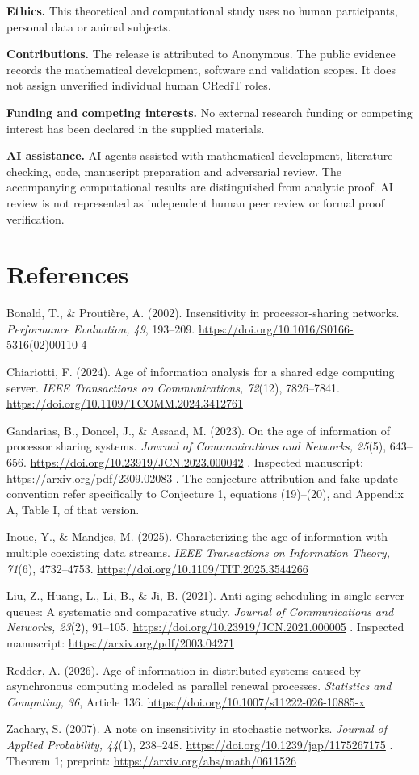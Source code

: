 \documentclass[
  11pt,
  a4paper,
]{scrartcl}
\begin{document}
\textbf{Ethics.} This theoretical and computational study uses no human
participants, personal data or animal subjects.

\textbf{Contributions.} The release is attributed to Anonymous. The
public evidence records the mathematical development, software and
validation scopes. It does not assign unverified individual human CRediT
roles.

\textbf{Funding and competing interests.} No external research funding
or competing interest has been declared in the supplied materials.

\textbf{AI assistance.} AI agents assisted with mathematical
development, literature checking, code, manuscript preparation and
adversarial review. The accompanying computational results are
distinguished from analytic proof. AI review is not represented as
independent human peer review or formal proof verification.

\section{References}\label{references}

Bonald, T., \& Proutière, A. (2002). Insensitivity in processor-sharing
networks. \emph{Performance Evaluation, 49}, 193--209.
\url{https://doi.org/10.1016/S0166-5316(02)00110-4}

Chiariotti, F. (2024). Age of information analysis for a shared edge
computing server. \emph{IEEE Transactions on Communications, 72}(12),
7826--7841. \url{https://doi.org/10.1109/TCOMM.2024.3412761}

Gandarias, B., Doncel, J., \& Assaad, M. (2023). On the age of
information of processor sharing systems. \emph{Journal of
Communications and Networks, 25}(5), 643--656.
\url{https://doi.org/10.23919/JCN.2023.000042} . Inspected manuscript:
\url{https://arxiv.org/pdf/2309.02083} . The conjecture attribution and
fake-update convention refer specifically to Conjecture 1, equations
(19)--(20), and Appendix A, Table I, of that version.

Inoue, Y., \& Mandjes, M. (2025). Characterizing the age of information
with multiple coexisting data streams. \emph{IEEE Transactions on
Information Theory, 71}(6), 4732--4753.
\url{https://doi.org/10.1109/TIT.2025.3544266}

Liu, Z., Huang, L., Li, B., \& Ji, B. (2021). Anti-aging scheduling in
single-server queues: A systematic and comparative study. \emph{Journal
of Communications and Networks, 23}(2), 91--105.
\url{https://doi.org/10.23919/JCN.2021.000005} . Inspected manuscript:
\url{https://arxiv.org/pdf/2003.04271}

Redder, A. (2026). Age-of-information in distributed systems caused by
asynchronous computing modeled as parallel renewal processes.
\emph{Statistics and Computing, 36}, Article 136.
\url{https://doi.org/10.1007/s11222-026-10885-x}

Zachary, S. (2007). A note on insensitivity in stochastic networks.
\emph{Journal of Applied Probability, 44}(1), 238--248.
\url{https://doi.org/10.1239/jap/1175267175} . Theorem 1; preprint:
\url{https://arxiv.org/abs/math/0611526}
\end{document}
